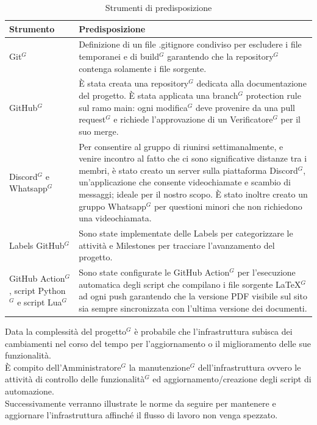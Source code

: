 \begin{table}[!h]
\centering
\renewcommand{\arraystretch}{1.15}
\begin{tabular}{|p{}|p{}|}
    \hline
    \textbf{Strumento} & \textbf{Predisposizione} \\
    \hline
    Git$^G$ & Definizione di un file .gitignore condiviso per escludere i file temporanei e di build$^G$ garantendo che la repository$^G$ contenga solamente i file sorgente. \\
    \hline
    GitHub$^G$ & È stata creata una repository$^G$ dedicata alla documentazione del progetto. È stata applicata una  branch$^G$ protection rule sul ramo main: ogni modifica$^G$ deve provenire da una pull request$^G$ e richiede l’approvazione di un Verificatore$^G$ per il suo merge.\\
    \hline
    Discord$^G$ e \newline Whatsapp$^G$ & Per consentire al gruppo di riunirsi settimanalmente, e venire incontro al fatto che ci sono significative distanze tra i membri, è stato creato un server sulla piattaforma Discord$^G$, un’applicazione che consente videochiamate e scambio di messaggi; ideale per il nostro scopo. È stato inoltre creato un gruppo Whatsapp$^G$ per questioni minori che non richiedono una videochiamata. \\
    \hline
    Labels GitHub$^G$ & Sono state implementate delle Labels per categorizzare le attività e Milestones per tracciare l’avanzamento del progetto.\\
    \hline
    GitHub Action$^G$, script Python$^G$ e script Lua$^G$ & Sono state configurate le GitHub Action$^G$ per l’esecuzione automatica degli script che compilano i file sorgente LaTeX$^G$ ad ogni push garantendo che la versione PDF visibile sul sito sia sempre sincronizzata con l’ultima versione dei documenti. \\
    \hline
\end{tabular}
\caption{Strumenti di predisposizione}
\end{table}

\newpage
{}
Data la complessità del progetto$^G$ è probabile che l’infrastruttura subisca dei cambiamenti nel corso del tempo per l’aggiornamento o il miglioramento delle sue funzionalità.\\
È compito dell’Amministratore$^G$ la manutenzione$^G$ dell’infrastruttura ovvero le attività di controllo delle funzionalità$^G$ ed aggiornamento/creazione degli script di automazione.\\
Successivamente verranno illustrate le norme da seguire per mantenere e aggiornare l’infrastruttura affinché il flusso di lavoro non venga spezzato.

